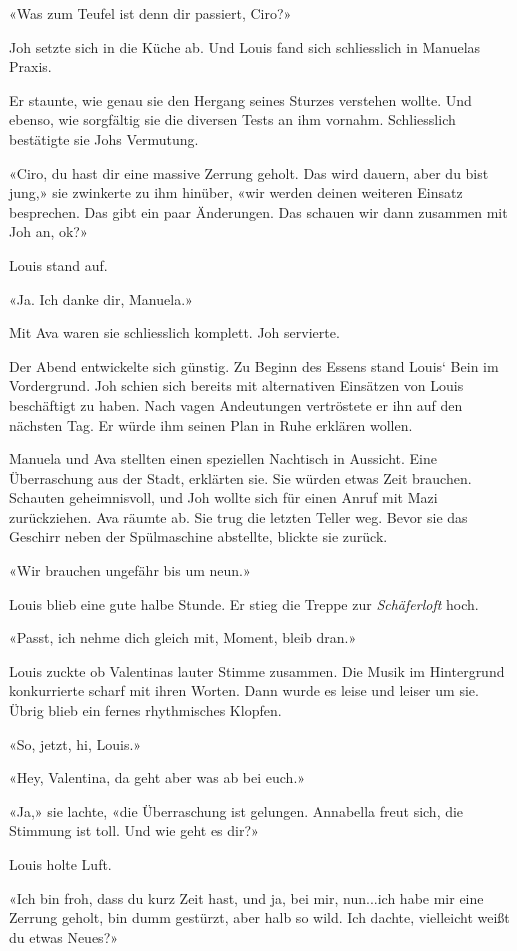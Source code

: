 «Was zum Teufel ist denn dir passiert, Ciro?»

Joh setzte sich in die Küche ab. Und Louis fand sich schliesslich in
Manuelas Praxis.

Er staunte, wie genau sie den Hergang seines Sturzes verstehen wollte.
Und ebenso, wie sorgfältig sie die diversen Tests an ihm vornahm.
Schliesslich bestätigte sie Johs Vermutung.

«Ciro, du hast dir eine massive Zerrung geholt. Das wird dauern, aber du
bist jung,» sie zwinkerte zu ihm hinüber, «wir werden deinen weiteren
Einsatz besprechen. Das gibt ein paar Änderungen. Das schauen wir dann
zusammen mit Joh an, ok?»

Louis stand auf.

«Ja. Ich danke dir, Manuela.»

Mit Ava waren sie schliesslich komplett. Joh servierte.

Der Abend entwickelte sich günstig. Zu Beginn des Essens stand Louis`
Bein im Vordergrund. Joh schien sich bereits mit alternativen Einsätzen
von Louis beschäftigt zu haben. Nach vagen Andeutungen vertröstete er
ihn auf den nächsten Tag. Er würde ihm seinen Plan in Ruhe erklären
wollen.

Manuela und Ava stellten einen speziellen Nachtisch in Aussicht. Eine
Überraschung aus der Stadt, erklärten sie. Sie würden etwas Zeit
brauchen. Schauten geheimnisvoll, und Joh wollte sich für einen Anruf
mit Mazi zurückziehen. Ava räumte ab. Sie trug die letzten Teller weg.
Bevor sie das Geschirr neben der Spülmaschine abstellte, blickte sie
zurück.

«Wir brauchen ungefähr bis um neun.»

Louis blieb eine gute halbe Stunde. Er stieg die Treppe zur
\emph{Schäferloft} hoch.

«Passt, ich nehme dich gleich mit, Moment, bleib dran.»

Louis zuckte ob Valentinas lauter Stimme zusammen. Die Musik im
Hintergrund konkurrierte scharf mit ihren Worten. Dann wurde es leise
und leiser um sie. Übrig blieb ein fernes rhythmisches Klopfen.

«So, jetzt, hi, Louis.»

«Hey, Valentina, da geht aber was ab bei euch.»

«Ja,» sie lachte, «die Überraschung ist gelungen. Annabella freut sich,
die Stimmung ist toll. Und wie geht es dir?»

Louis holte Luft.

«Ich bin froh, dass du kurz Zeit hast, und ja, bei mir, nun...ich habe
mir eine Zerrung geholt, bin dumm gestürzt, aber halb so wild. Ich
dachte, vielleicht weißt du etwas Neues?»

